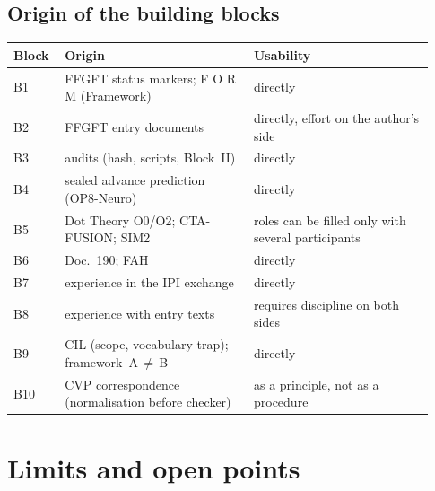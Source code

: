 \subsection{Origin of the building blocks}

\begin{center}
\small
\begin{tabular}{@{}p{0.11\linewidth}p{0.42\linewidth}p{0.40\linewidth}@{}}
\toprule
\textbf{Block} & \textbf{Origin} & \textbf{Usability} \\
\midrule
B1 & FFGFT status markers; F O R M (Framework) & directly \\
B2 & FFGFT entry documents & directly, effort on the author's side \\
B3 & audits (hash, scripts, Block~II) & directly \\
B4 & sealed advance prediction (OP8-Neuro) & directly \\
B5 & Dot Theory O0/O2; CTA-FUSION; SIM2 & roles can be filled only with several participants \\
B6 & Doc.~190; FAH & directly \\
B7 & experience in the IPI exchange & directly \\
B8 & experience with entry texts & requires discipline on both sides \\
B9 & CIL (scope, vocabulary trap); framework~A\,$\neq$\,B & directly \\
B10 & CVP correspondence (normalisation before checker) & as a principle, not as a procedure \\
\bottomrule
\end{tabular}
\end{center}

\section{Limits and open points}

